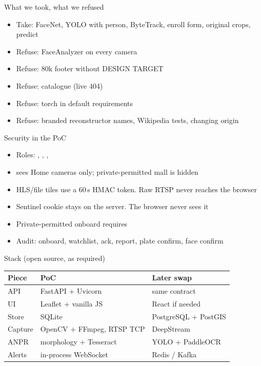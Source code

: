 \documentclass[aspectratio=169,11pt]{beamer}
\begin{document}
\begin{frame}{What we took, what we refused}
\begin{itemize}\itemsep0.45em
\item Take: FaceNet, YOLO with person, ByteTrack, enroll form, original crops, predict
\item Refuse: FaceAnalyzer on every camera
\item Refuse: 80k footer without DESIGN TARGET
\item Refuse: catalogue  (live 404)
\item Refuse: torch in default requirements
\item Refuse: branded reconstructor names, Wikipedia tests, changing origin
\end{itemize}
\end{frame}

\begin{frame}{Security in the PoC}
\begin{itemize}\itemsep0.55em
\item Roles: , , , 
\item {} sees Home cameras only; private-permitted mall is hidden
\item HLS/file tiles use a 60\,s HMAC token. Raw RTSP never reaches the browser
\item Sentinel cookie stays on the server. The browser never sees it
\item Private-permitted onboard requires 
\item Audit: onboard, watchlist, ack, report, plate confirm, face confirm
\end{itemize}
\end{frame}

\begin{frame}{Stack (open source, as required)}
\begin{center}
\begin{tabular}{@{}lll@{}}
\toprule
Piece & PoC & Later swap \\
\midrule
API & FastAPI + Uvicorn & same contract \\
UI & Leaflet + vanilla JS & React if needed \\
Store & SQLite & PostgreSQL + PostGIS \\
Capture & OpenCV + FFmpeg, RTSP TCP & DeepStream \\
ANPR & morphology + Tesseract & YOLO + PaddleOCR \\
Alerts & in-process WebSocket & Redis / Kafka \\
\bottomrule
\end{tabular}
\end{center}
\end{frame}
\end{document}
